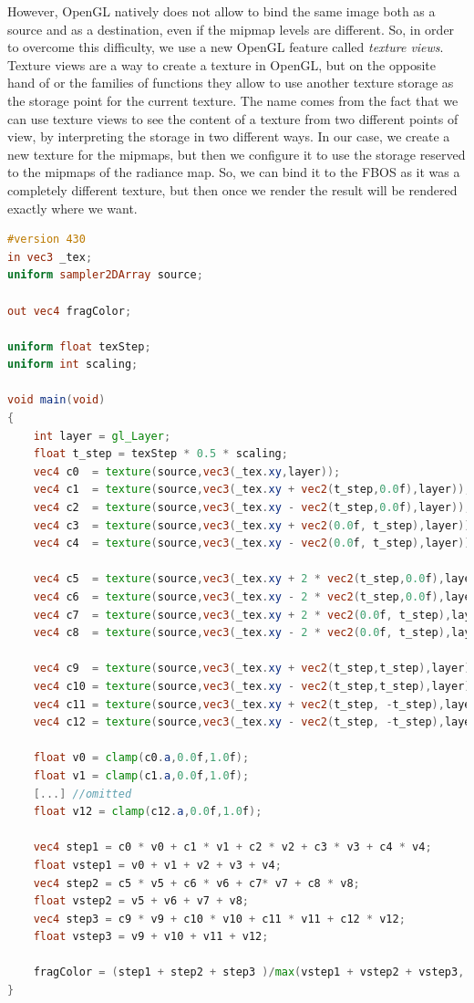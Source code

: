 However, OpenGL natively does not allow to bind the same image both as a source and as a destination, even if the mipmap levels are different. So, in order to overcome this difficulty, we use a new OpenGL feature called \emph{texture views}. Texture views are a way to create a texture in OpenGL, but on the opposite hand of  or the  families of functions they allow to use another texture storage as the storage point for the current texture. The name comes from the fact that we can use texture views to see the content of a texture from two different points of view, by interpreting the storage in two different ways. In our case, we create a new texture for the mipmaps, but then we configure it to use the storage reserved to the mipmaps of the radiance map. So, we can bind it to the FBOS as it was a completely different texture, but then once we render the result will be rendered exactly where we want. %

\begin{lstlisting}[language=GLSL,label=lst:shaderimageprocessing,caption={Custom mipmap filtering on GPU. \gl{_tex} are the texture coordinates on the screen aligned quad.}]
#version 430
in vec3 _tex;
uniform sampler2DArray source;

out vec4 fragColor;

uniform float texStep;
uniform int scaling;

void main(void)
{
	int layer = gl_Layer;
	float t_step = texStep * 0.5 * scaling;
	vec4 c0  = texture(source,vec3(_tex.xy,layer));
	vec4 c1  = texture(source,vec3(_tex.xy + vec2(t_step,0.0f),layer));
	vec4 c2  = texture(source,vec3(_tex.xy - vec2(t_step,0.0f),layer));
	vec4 c3  = texture(source,vec3(_tex.xy + vec2(0.0f, t_step),layer));
	vec4 c4  = texture(source,vec3(_tex.xy - vec2(0.0f, t_step),layer));

	vec4 c5  = texture(source,vec3(_tex.xy + 2 * vec2(t_step,0.0f),layer));
	vec4 c6  = texture(source,vec3(_tex.xy - 2 * vec2(t_step,0.0f),layer));
	vec4 c7  = texture(source,vec3(_tex.xy + 2 * vec2(0.0f, t_step),layer));
	vec4 c8  = texture(source,vec3(_tex.xy - 2 * vec2(0.0f, t_step),layer));

	vec4 c9  = texture(source,vec3(_tex.xy + vec2(t_step,t_step),layer));
	vec4 c10 = texture(source,vec3(_tex.xy - vec2(t_step,t_step),layer));
	vec4 c11 = texture(source,vec3(_tex.xy + vec2(t_step, -t_step),layer));
	vec4 c12 = texture(source,vec3(_tex.xy - vec2(t_step, -t_step),layer));

	float v0 = clamp(c0.a,0.0f,1.0f);
	float v1 = clamp(c1.a,0.0f,1.0f);
	[...] //omitted
	float v12 = clamp(c12.a,0.0f,1.0f);

	vec4 step1 = c0 * v0 + c1 * v1 + c2 * v2 + c3 * v3 + c4 * v4;
	float vstep1 = v0 + v1 + v2 + v3 + v4;
	vec4 step2 = c5 * v5 + c6 * v6 + c7* v7 + c8 * v8;
	float vstep2 = v5 + v6 + v7 + v8;
	vec4 step3 = c9 * v9 + c10 * v10 + c11 * v11 + c12 * v12;
	float vstep3 = v9 + v10 + v11 + v12;

	fragColor = (step1 + step2 + step3 )/max(vstep1 + vstep2 + vstep3, 1.0f);
}
\end{lstlisting}

